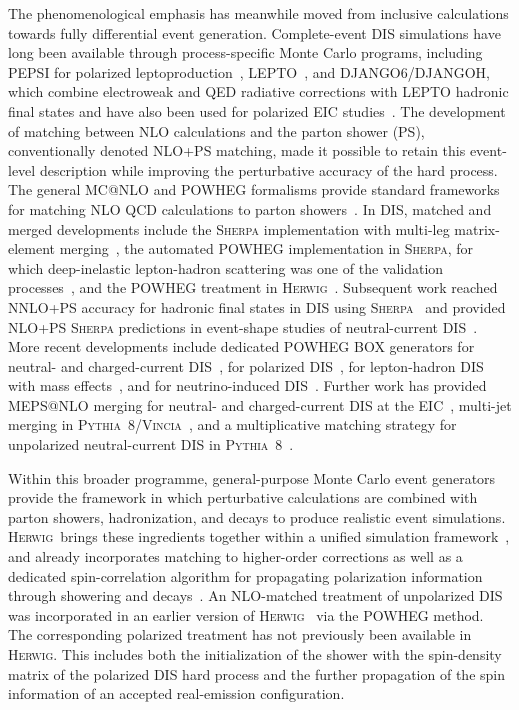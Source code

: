 \documentclass[a4paper,11pt]{article}
\newcommand{\Herwig}{\textsc{Herwig}}
\begin{document}
The phenomenological emphasis has meanwhile moved from inclusive calculations towards fully differential event generation. Complete-event DIS simulations have long been available through process-specific Monte Carlo programs, including \textsc{PEPSI} for polarized leptoproduction~\cite{Mankiewicz:1991jc}, \textsc{LEPTO}~\cite{Ingelman:1996mq}, and \textsc{DJANGO6}/\textsc{DJANGOH}, which combine electroweak and QED radiative corrections with \textsc{LEPTO} hadronic final states and have also been used for polarized EIC studies~\cite{Charchula:1994kf,Aschenauer:2013iia}. The development of matching between NLO calculations and the parton shower (PS), conventionally denoted NLO+PS matching, made it possible to retain this event-level description while improving the perturbative accuracy of the hard process. The general MC@NLO and POWHEG formalisms provide standard frameworks for matching NLO QCD calculations to parton showers~\cite{Frixione:2002ik,Nason:2004rx,Frixione:2007vw}. In DIS, matched and merged developments include the \textsc{Sherpa} implementation with multi-leg matrix-element merging~\cite{Carli:2009cg}, the automated POWHEG implementation in \textsc{Sherpa}, for which deep-inelastic lepton-hadron scattering was one of the validation processes~\cite{Hoche:2010kg}, and the POWHEG treatment in \Herwig~\cite{DErrico:2011wfa}. Subsequent work reached NNLO+PS accuracy for hadronic final states in DIS using \textsc{Sherpa}~\cite{Hoche:2018suf} and provided NLO+PS \textsc{Sherpa} predictions in event-shape studies of neutral-current DIS~\cite{Knobbe:2023jth}. More recent developments include dedicated POWHEG BOX generators for neutral- and charged-current DIS~\cite{Banfi:2023dis}, for polarized DIS~\cite{Borsa:2024rmh}, for lepton-hadron DIS with mass effects~\cite{Buonocore:2024pdv}, and for neutrino-induced DIS~\cite{FerrarioRavasio:2024disnu}. Further work has provided MEPS@NLO merging for neutral- and charged-current DIS at the EIC~\cite{Meinzinger:2025dis}, multi-jet merging in \textsc{Pythia}~8/\textsc{Vincia}~\cite{Helenius:2024disjets}, and a multiplicative matching strategy for unpolarized neutral-current DIS in \textsc{Pythia}~8~\cite{Helenius:2026pym}.

Within this broader programme, general-purpose Monte Carlo event generators provide the framework in which perturbative calculations are combined with parton showers, hadronization, and decays to produce realistic event simulations. \Herwig\ brings these ingredients together within a unified simulation framework~\cite{Bahr:2008pv,Gieseke:2011na,Arnold:2012fq,Bellm:2013hwb,Bellm:2015jjp,Bellm:2017bvx,Bellm:2019zci,Bewick:2023tfi,Bellm:2025pcw}, and already incorporates matching to higher-order corrections as well as a dedicated spin-correlation algorithm for propagating polarization information through showering and decays~\cite{Richardson:2018pvo}. An NLO-matched treatment of unpolarized DIS was incorporated in an earlier version of \Herwig~\cite{DErrico:2011wfa} via the POWHEG method. The corresponding polarized treatment has not previously been available in \Herwig. This includes both the initialization of the shower with the spin-density matrix of the polarized DIS hard process and the further propagation of the spin information of an accepted real-emission configuration.
\end{document}
